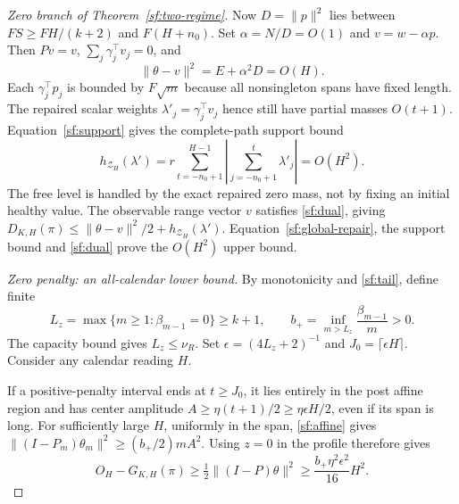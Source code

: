 \documentclass[journal]{IEEEtran}
\begin{document}
\begin{proof}[Zero branch of Theorem~\ref{sf:two-regime}]
Now $D=\|p\|^2$ lies between $FS\ge FH/(k+2)$ and $F(H+n_0)$.
Set $\alpha=N/D=O(1)$ and $v=w-\alpha p$.
Then $Pv=v$, $\sum_j\gamma_j^\top v_j=0$, and
\begin{equation}\label{sf:global-repair}
\|\theta-v\|^2=E+\alpha^2D=O(H).
\end{equation}
Each $\gamma_j^\top p_j$ is bounded by $F\sqrt m$ because
all nonsingleton spans have fixed length. The repaired scalar weights
$\lambda'_j=\gamma_j^\top v_j$ hence still have partial masses $O(t+1)$.
Equation~\eqref{sf:support} gives the complete-path support bound
\begin{equation}\label{sf:zero-support}
h_{\mathcal Z_H}(\lambda')=
r\sum_{t=-n_0+1}^{H-1}
 \left|\sum_{j=-n_0+1}^t\lambda'_j\right|=O(H^2).
\end{equation}
The free level is handled by the exact repaired zero mass, not by fixing
an initial healthy value.
The observable range vector $v$ satisfies \eqref{sf:dual}, giving
$D_{K,H}(\pi)\le\|\theta-v\|^2/2+h_{\mathcal Z_H}(\lambda')$.
Equation~\eqref{sf:global-repair}, the support bound and \eqref{sf:dual}
prove the $O(H^2)$ upper bound.

\par\smallskip\noindent\textit{Zero penalty: an all-calendar lower bound.}\enspace 
By monotonicity and \eqref{sf:tail}, define finite
\[
L_z=\max\{m\ge1:\beta_{m-1}=0\}\ge k+1,\qquad
b_+=\inf_{m>L_z}\frac{\beta_{m-1}}m>0 .
\]
The capacity bound gives $L_z\le\nu_R$.
Set $\epsilon=(4L_z+2)^{-1}$ and $J_0=\lceil\epsilon H\rceil$.
Consider any calendar reading $H$.

If a positive-penalty interval ends at $t\ge J_0$, it lies entirely
in the post affine region and has center amplitude
$A\ge\eta(t+1)/2\ge\eta\epsilon H/2$, even if its span is long.
For sufficiently large $H$, uniformly in the span,
\eqref{sf:affine} gives
$\|(I-P_m)\theta_m\|^2\ge(b_+/2)mA^2$.
Using $z=0$ in the profile therefore gives
\begin{equation}\label{sf:zero-positive-case}
O_H-G_{K,H}(\pi)\ge\tfrac12\|(I-P)\theta\|^2
\ge \frac{b_+\eta^2\epsilon^2}{16}H^2 .
\end{equation}


\end{proof}
\end{document}
